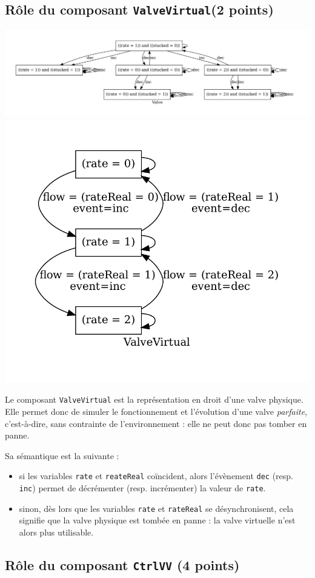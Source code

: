 \documentclass[a4paper]{book}
\begin{document}
\subsection{Rôle du composant {\tt ValveVirtual}(2 points)}
\includegraphics[height=.2\textheight,width=.5\textwidth]{Graphs/Valve-modes.pdf}
\includegraphics[height=.2\textheight,width=.5\textwidth]{Graphs/ValveVirtual-modes.pdf}

Le composant \texttt{ValveVirtual} est la représentation en droit d'une valve
physique. Elle permet donc de simuler le fonctionnement et l'évolution d'une
valve \textit{parfaite}, c'est-à-dire, sans contrainte de l'environnement :
elle ne peut donc pas tomber en panne.

Sa sémantique est la suivante :
\begin{itemize}
  \item si les variables \texttt{rate} et \texttt{reateReal} coïncident, alors
    l'évènement \texttt{dec} (resp. \texttt{inc}) permet de décrémenter (resp.
    incrémenter) la valeur de \texttt{rate}.
  \item sinon, dès lors que les variables \texttt{rate} et \texttt{rateReal} se
    désynchronisent, cela signifie que la valve physique est tombée en panne :
    la valve virtuelle n'est alors plus utilisable.
\end{itemize}

\subsection{Rôle du composant {\tt CtrlVV} (4 points)}
\end{document}
